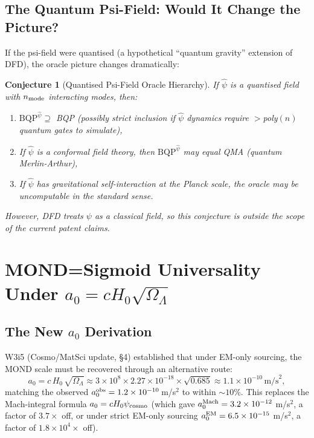 \documentclass[11pt]{article}
\newtheorem{conjecture}[theorem]{Conjecture}
\theoremstyle{definition}
\theoremstyle{remark}
\newcommand{\ee}[1]{\times 10^{#1}}
\begin{document}
\subsection{The Quantum Psi-Field: Would It Change the Picture?}
\label{sec:quantum-psi-field}

If the psi-field were quantised (a hypothetical ``quantum gravity''
extension of DFD), the oracle picture changes dramatically:

\begin{conjecture}[Quantised Psi-Field Oracle Hierarchy]
\label{conj:quantum-psi-oracle}
If $\hat\psi$ is a quantised field with $n_{\rm mode}$ interacting
modes, then:
\begin{enumerate}[label=(\roman*)]
  \item $\mathrm{BQP}^{\hat\psi} \supseteq$ BQP (possibly strict
    inclusion if $\hat\psi$ dynamics require $>$poly$(n)$ quantum
    gates to simulate),
  \item If $\hat\psi$ is a conformal field theory, then
    $\mathrm{BQP}^{\hat\psi}$ may equal QMA (quantum Merlin-Arthur),
  \item If $\hat\psi$ has gravitational self-interaction at the Planck
    scale, the oracle may be uncomputable in the standard sense.
\end{enumerate}
However, DFD treats $\psi$ as a \emph{classical} field, so this
conjecture is outside the scope of the current patent claims.
\end{conjecture}

\section{MOND=Sigmoid Universality Under $a_0 = cH_0\sqrt{\Omega_\Lambda}$}
\label{sec:mond-sigmoid-universality}

\subsection{The New $a_0$ Derivation}
\label{sec:new-a0}

W3i5 (Cosmo/MatSci update, \S4) established that under EM-only sourcing,
the MOND scale must be recovered through an alternative route:
\begin{equation}
  a_0 = c\,H_0\,\sqrt{\Omega_\Lambda} \approx 3\ee{8}\times 2.27\ee{-18}
  \times \sqrt{0.685} \approx 1.1\ee{-10}\,\text{m/s}^2,
  \label{eq:a0-new}
\end{equation}
matching the observed $a_0^{\rm obs} = 1.2\ee{-10}$\,m/s$^2$ to within
$\sim 10\%$.  This replaces the Mach-integral formula
$a_0 = cH_0\psi_{\rm cosmo}$ (which gave $a_0^{\rm Mach} = 3.2\ee{-12}$
m/s$^2$, a factor of $3.7\times$ off, or under strict EM-only sourcing
$a_0^{\rm EM} = 6.5\ee{-15}$ m/s$^2$, a factor of $1.8\ee{4}\times$ off).
\end{document}
